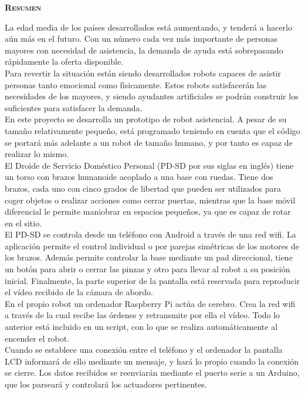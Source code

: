 \vspace*{2cm}

\begin{center}
\color{part} \textsc{\huge \textbf{Resumen}}\\[1cm]
\end{center}


La edad media de los países desarrollados está aumentando, y tenderá a hacerlo aún más en el futuro. Con un número cada vez más importante de personas mayores con necesidad de asistencia, la demanda de ayuda está sobrepasando rápidamente la oferta disponible.\\

Para revertir la situación están siendo desarrollados robots capaces de asistir personas tanto emocional como físicamente. Estos robots satisfacerán las necesidades de los mayores, y siendo ayudantes artificiales se podrán construir los suficientes para satisfacer la demanda.\\

En este proyecto se desarrolla un prototipo de robot asistencial. A pesar de su tamaño relativamente pequeño, está programado teniendo en cuenta que el código se portará más adelante a un robot de tamaño humano, y por tanto es capaz de realizar lo mismo.\\

El Droide de Servicio Doméstico Personal (PD-SD por sus siglas en inglés) tiene un torso con brazos humanoide acoplado a una base con ruedas. Tiene dos brazos, cada uno con cinco grados de libertad que pueden ser utilizados para coger objetos o realizar acciones como cerrar puertas, mientras que la base móvil diferencial le permite maniobrar en espacios pequeños, ya que es capaz de rotar en el sitio.\\

El PD-SD se controla desde un teléfono con Android a través de una red wifi. La aplicación permite el control individual o por parejas simétricas de los motores de los brazos. Además permite controlar la base mediante un pad direccional, tiene un botón para abrir o cerrar las pinzas y otro para llevar al robot a su posición inicial. Finalmente, la parte superior de la pantalla está reservada para reproducir el vídeo recibido de la cámara de abordo.\\

En el propio robot un ordenador Raspberry Pi actúa de cerebro. Crea la red wifi a través de la cual recibe las órdenes y retransmite por ella el vídeo. Todo lo anterior está incluido en un script, con lo que se realiza automáticamente al encender el robot.\\

Cuando se establece una conexión entre el teléfono y el ordenador la pantalla LCD informará de ello mediante un mensaje, y hará lo propio cuando la conexión se cierre. Los datos recibidos se reenviarán mediante el puerto serie a un Arduino, que los parseará y controlará los actuadores pertinentes.